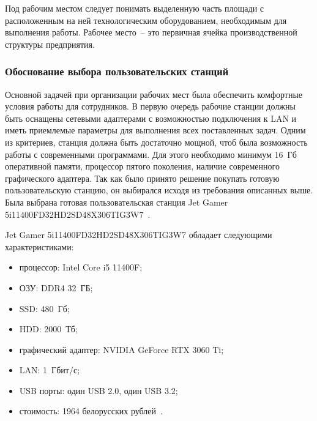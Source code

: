 Под рабочим местом следует понимать выделенную часть площади с расположенным на ней технологическим оборудованием, необходимым для выполнения работы. Рабочее место~-- это первичная ячейка производственной структуры предприятия.

\subsubsection{Обоснование выбора пользовательских станций}

Основной задачей при организации рабочих мест была обеспечить комфортные условия работы для сотрудников. В первую очередь рабочие станции должны быть оснащены сетевыми адаптерами с возможностью подключения к LAN и иметь приемлемые параметры для выполнения всех поставленных задач. Одним из критериев, станция должна быть достаточно мощной, чтоб была возможность работы с современными программами. Для этого необходимо минимум 16~Гб оперативной памяти, процессор пятого поколения, наличие современного графического адаптера. Так как было принято решение покупать готовую пользовательскую станцию, он выбирался исходя из требования описанных выше. Была выбрана готовая пользовательская станция Jet Gamer 5i11400FD32HD2SD48X306TIG3W7~\cite{pc}.

Jet Gamer 5i11400FD32HD2SD48X306TIG3W7 обладает следующими характеристиками:

\begin{itemize}
    \item процессор: Intel Core i5 11400F;
    \item ОЗУ: DDR4 32~ГБ;
    \item SSD: 480~Гб;
    \item HDD: 2000~Тб;
    \item графический адаптер: NVIDIA GeForce RTX 3060 Ti;
    \item LAN: 1~Гбит/с;
    \item USB порты: один USB 2.0, один USB 3.2;
    \item стоимость: 1964 белорусских рублей~\cite{pc}.
\end{itemize}


